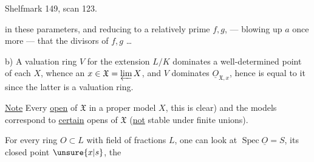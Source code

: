 Shelfmark 149, scan 123.

in these parameters, and reducing to a relatively prime $f,g$,  --- blowing up $a$ once more --- that the divisors of $f,g$  \ldots

b) A valuation ring $V$  for the extension $L/K$ dominates a well-determined point of each $X$, whence an $x\in\mathfrak X=\varprojlim X$, and $V$ dominates $\underline{O}_{\mathfrak X,x}$, hence is equal to it since the latter is a valuation ring.

\uline{Note} Every  \uline{open} of $\mathfrak X$    in a proper model $X$, this is clear) and  the models correspond to \uline{certain} opens of $\mathfrak X$ (\uline{not} stable under finite unions).

For every   ring $O\subset L$ with field of fractions $L$, one can look at $\operatorname{Spec}\underline{O}=S$, its closed point $\unsure{x|s}$, the 
